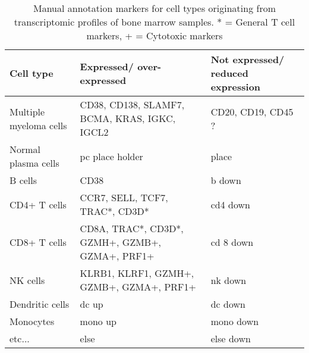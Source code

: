 \begin{table}[h]
    \centering
\begin{tabular}{|p{2cm}|p{6cm}|p{5cm}|}
\hline
\textbf{Cell type}     & \textbf{Expressed/ over-expressed}                                                                      & \textbf{Not expressed/ reduced expression} \\ \hline
Multiple myeloma cells & CD38, CD138, SLAMF7,  BCMA, KRAS, IGKC, IGCL2                                                             & CD20, CD19, CD45 ?                       \\ \hline
Normal plasma cells    & pc place holder                                                                                           & place                                    \\ \hline
B cells                & CD38                                                                                                      & b down                                   \\ \hline
CD4+ T cells           & CCR7, SELL, TCF7, TRAC*, CD3D*                                                                            & cd4 down                                 \\ \hline
CD8+ T cells           & CD8A, TRAC*,  CD3D*, GZMH+,  GZMB+,  GZMA+,  PRF1+                                                        & cd 8 down                                                         \\ \hline
NK cells               & KLRB1,  KLRF1, GZMH+,  GZMB+,  GZMA+,  PRF1+                                                              & nk down                                  \\ \hline
Dendritic cells        & dc up                                                                                                     & dc down                                  \\ \hline
Monocytes              & mono up                                                                                                   & mono down                                \\ \hline
etc...                 & else                                                                                                      & else down                                \\ \hline
\end{tabular}
\caption[Manual annotation markers]{Manual annotation markers for cell types originating from transcriptomic profiles of bone marrow samples.
* = General T cell markers, + = Cytotoxic markers}
\label{tab:annotation_markers}
\end{table}